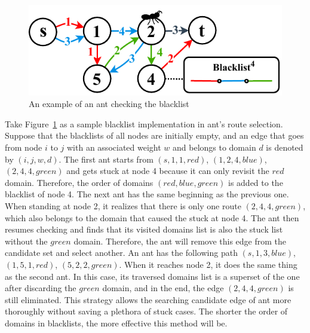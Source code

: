 \setlength{\intextsep}{3pt}
\renewcommand{\scalefigure}{0.9}
\begin{figure}[htbp]
	\centering
	\includegraphics[scale=\scalefigure]{Figures/chap 3/BlacklistV2.pdf}
	\caption{An example of an ant checking the blacklist}
	\label{fig:blacklist}
\end{figure}

Take Figure~\ref{fig:blacklist} as a sample blacklist implementation in ant's route selection. Suppose that the blacklists of all nodes are initially empty, and an edge that goes from node $i$ to $j$ with an associated weight $w$ and belongs to domain $d$ is denoted by $(i, j, w, d)$. The first ant starts from $(s, 1, 1, red)$, $(1, 2, 4, blue)$, $(2, 4, 4, green)$ and gets stuck at node 4 because it can only revisit the $red$ domain. Therefore, the order of domains $(red, blue, green)$ is added to the blacklist of node 4. The next ant has the same beginning as the previous one. When standing at node 2, it realizes that there is only one route $(2, 4, 4, green)$, which also belongs to the domain that caused the stuck at node 4. The ant then resumes checking and finds that its visited domains list is also the stuck list without the $green$ domain. Therefore, the ant will remove this edge from the candidate set and select another. An ant has the following path $(s, 1, 3, blue)$, $(1, 5, 1, red)$, $(5, 2, 2, green)$. When it reaches node 2, it does the same thing as the second ant. In this case, its traversed domains list is a superset of the one after discarding the $green$ domain, and in the end, the edge $(2, 4, 4, green)$ is still eliminated. This strategy allows the searching candidate edge of ant more thoroughly without saving a plethora of stuck cases. The shorter the order of domains in blacklists, the more effective this method will be.